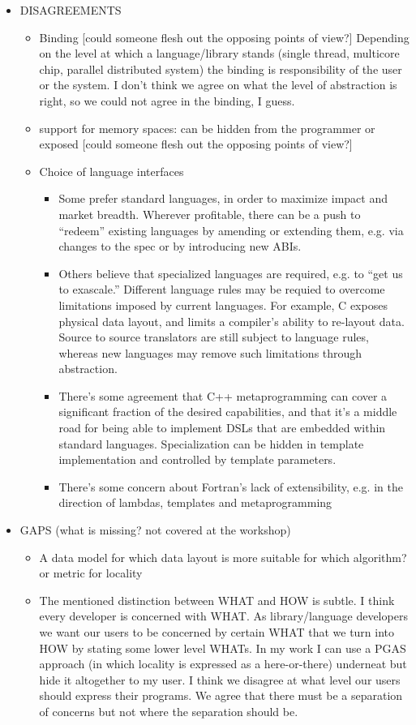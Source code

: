 \begin{itemize}
\item  DISAGREEMENTS
  \begin{itemize}
  \item Binding [could someone flesh out the opposing points of view?] Depending on the level at which a language/library stands (single thread, multicore chip, parallel distributed system) the binding is responsibility of the user or the system. I don't think we agree on what the level of abstraction is right, so we could not agree in the binding, I guess.
  \item support for memory spaces: can be hidden from the programmer or exposed [could someone flesh out the opposing points of view?]
  \item Choice of language interfaces
    \begin{itemize}
    \item Some prefer standard languages, in order to maximize impact and market breadth.  Wherever profitable, there can be a push to ``redeem'' existing languages by amending or extending them, e.g. via changes to the spec or by introducing new ABIs.
    \item Others believe that specialized languages are required, e.g. to ``get us to exascale.''  Different language rules may be requied to overcome limitations imposed by current languages.  For example, C exposes physical data layout, and limits a compiler's ability to re-layout data.  Source to source translators are still subject to language rules, whereas new languages may remove such limitations through abstraction.
    \item There's some agreement that C++ metaprogramming can cover a significant fraction of the desired capabilities, and that it's a middle road for being able to implement DSLs that are embedded within standard languages.  Specialization can be hidden in template implementation and controlled by template parameters.
    \item There's some concern about Fortran's lack of extensibility, e.g. in the direction of lambdas, templates and metaprogramming
    \end{itemize}
  \end{itemize}

\item GAPS (what is missing? not covered at the workshop)
  \begin{itemize}
  \item A data model for which data layout is more suitable for which algorithm? or metric for locality
  \item The mentioned distinction between WHAT and HOW is subtle. I think every developer is concerned with WHAT. As library/language developers we want our users to be concerned by certain WHAT that we turn into HOW by stating some lower level WHATs. In my work I can use a PGAS approach (in which locality is expressed as a here-or-there) underneat but hide it altogether to my user. I think we disagree at what level our users should express their programs. We agree that there must be a separation of concerns but not where the separation should be.
  \end{itemize}


\end{itemize}
